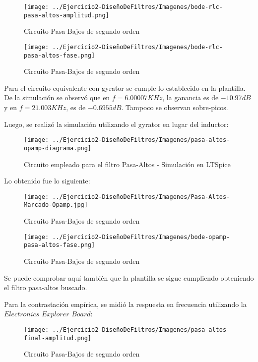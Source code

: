 \begin{figure}[H]
    \centering
    \texttt{[image: ../Ejercicio2-DiseñoDeFiltros/Imagenes/bode-rlc-pasa-altos-amplitud.png]}
    \caption{Circuito Pasa-Bajos de segundo orden}
\end{figure}

\begin{figure}[H]
    \centering
    \texttt{[image: ../Ejercicio2-DiseñoDeFiltros/Imagenes/bode-rlc-pasa-altos-fase.png]}
    \caption{Circuito Pasa-Bajos de segundo orden}
\end{figure}

Para el circuito equivalente con gyrator se cumple lo establecido en la plantilla.
De la simulación se observó que en $f=6.00007 KHz$, la ganancia es de $-10.97 dB$ y en $f=21.003KHz$, es de $-0.6955 dB$.
Tampoco se observan sobre-picos.

Luego, se realizó la simulación utilizando el gyrator en lugar del inductor:

\begin{figure}[H]
    \centering
    \texttt{[image: ../Ejercicio2-DiseñoDeFiltros/Imagenes/pasa-altos-opamp-diagrama.png]}
    \caption{Circuito empleado para el filtro Pasa-Altos - Simulación en LTSpice}
\end{figure}

Lo obtenido fue lo siguiente:

\begin{figure}[H]
    \centering
    \texttt{[image: ../Ejercicio2-DiseñoDeFiltros/Imagenes/Pasa-Altos-Marcado-Opamp.jpg]}
    \caption{Circuito Pasa-Bajos de segundo orden}
\end{figure}

\begin{figure}[H]
    \centering
    \texttt{[image: ../Ejercicio2-DiseñoDeFiltros/Imagenes/bode-opamp-pasa-altos-fase.png]}
    \caption{Circuito Pasa-Bajos de segundo orden}
\end{figure}

Se puede comprobar aquí también que la plantilla se sigue cumpliendo obteniendo el filtro pasa-altos buscado.

Para la contrastación empírica, se midió la respuesta en frecuencia utilizando la $Electronics$ $Explorer$ $Board$:

\begin{figure}[H]
    \centering
    \texttt{[image: ../Ejercicio2-DiseñoDeFiltros/Imagenes/pasa-altos-final-amplitud.png]}
    \caption{Circuito Pasa-Bajos de segundo orden}
\end{figure}

